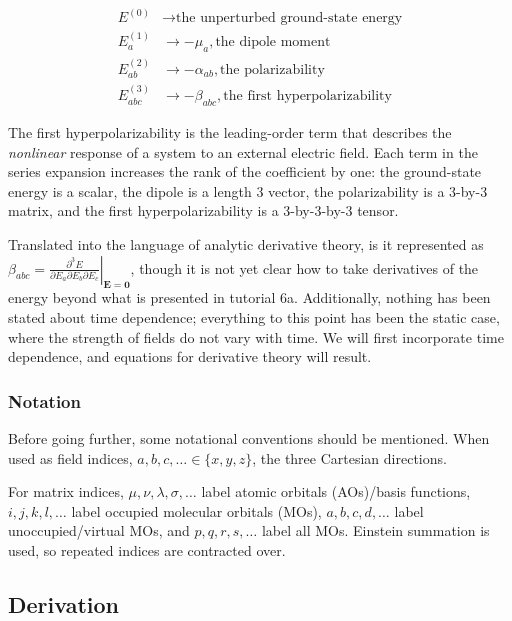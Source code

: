 \documentclass[]{article}
\begin{document}
\begin{align}
E^{(0)} &\rightarrow \textrm{the unperturbed ground-state energy} \\
E_{a}^{(1)} &\rightarrow -\mu_{a},\textrm{the dipole moment} \\
E_{ab}^{(2)} &\rightarrow -\alpha_{ab},\textrm{the polarizability} \\
E_{abc}^{(3)} &\rightarrow -\beta_{abc},\textrm{the first hyperpolarizability}
\end{align}

The first hyperpolarizability is the leading-order term that describes
the \emph{nonlinear} response of a system to an external electric field.
Each term in the series expansion increases the rank of the coefficient
by one: the ground-state energy is a scalar, the dipole is a length 3
vector, the polarizability is a 3-by-3 matrix, and the first
hyperpolarizability is a 3-by-3-by-3 tensor.

Translated into the language of analytic derivative theory, is it
represented as
\(\beta_{abc} = \left.\frac{\partial^{3} E}{\partial E_a \partial E_b \partial E_c}\right|_{\mathbf{E}=\mathbf{0}}\),
though it is not yet clear how to take derivatives of the energy beyond
what is presented in tutorial 6a. Additionally, nothing has been stated
about time dependence; everything to this point has been the static
case, where the strength of fields do not vary with time. We will first
incorporate time dependence, and equations for derivative theory will
result.

\hypertarget{notation}{%
\subsubsection{Notation}\label{notation}}

Before going further, some notational conventions should be mentioned.
When used as field indices, \(a,b,c,\dots \in \{x,y,z\}\), the three
Cartesian directions.

For matrix indices, \(\mu,\nu,\lambda,\sigma,\dots\) label atomic
orbitals (AOs)/basis functions, \(i,j,k,l,\dots\) label occupied
molecular orbitals (MOs), \(a,b,c,d,\dots\) label unoccupied/virtual
MOs, and \(p,q,r,s,\dots\) label all MOs. Einstein summation is used, so
repeated indices are contracted over.

\hypertarget{derivation}{%
\subsection{Derivation}\label{derivation}}
\end{document}
